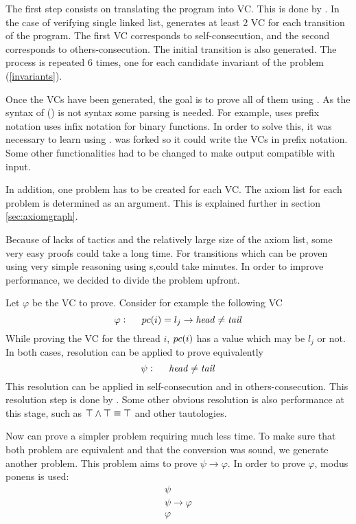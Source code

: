 The first step consists on translating the program into \gls{VC}. 
%
This is done by \leap. 
%
In the case of verifying single linked list, \leap generates at least 2 \gls{VC} for each transition of the program. 
%
The first \gls{VC} corresponds to self-consecution, and the second corresponds to others-consecution.
%
The initial transition is also generated.
%
The process is repeated 6 times, one for each candidate invariant of the problem (\ref{invariants}).

Once the \gls{VC}s have been generated, the goal is to prove all of them using \spass. 
%
As the syntax of \spass (\cite{spasssyntax}) is not \leap syntax some parsing is needed. 
%
For example, \spass uses prefix notation  \leap uses infix notation for binary functions.
%
In order to solve this, it was necessary to learn \ocaml using .
%
\leap was forked so it could write the \gls{VC}s in prefix notation.
%
Some other \leap functionalities had to be changed to make \leap output compatible with \spass input.

In addition, one \spass problem has to be created for each \gls{VC}. 
%
The axiom list for each problem is determined as an argument. 
%
This is explained further in section \ref{sec:axiomgraph}.

Because of \spass lacks of tactics and the relatively large size of the axiom list, some very easy proofs could take a long time.
%
For transitions which can be proven using very simple reasoning using \pc s,\spass could take minutes. 
%
In order to improve \spass performance, we decided to divide the problem upfront.

Let $\varphi$ be the \gls{VC} to prove. Consider for example the following \gls{VC}
	\[
		\varphi : \;\;\;\;\; pc(i) = l_j \to \mathit{head} \not = \mathit{tail}
	\]
While proving the \gls{VC} for the thread $i$, $pc(i)$ has a value which may be $l_j$ or not. 
%
In both cases, resolution can be applied to prove equivalently
	\[
		\psi : \;\;\;\;\; \mathit{head} \not = \mathit{tail}
	\]
This resolution can be applied in self-consecution and in others-consecution. 
%
This resolution step is done by \gandalf. 
%
Some other obvious resolution is also performance at this stage, such as $\top \wedge \top \equiv \top$ and other tautologies.

Now \spass can prove a simpler problem requiring much less time.
%
To make sure that both problem are equivalent and that the conversion was sound, we generate another \spass problem. 
%
This \spass problem aims to prove $\psi \to \varphi$.
%
In order to prove $\varphi$, modus ponens is used:
\[
	\begin{array}{l}
		\psi\\
		\psi \to \varphi\\\hline
		\varphi
	\end{array}
\]

